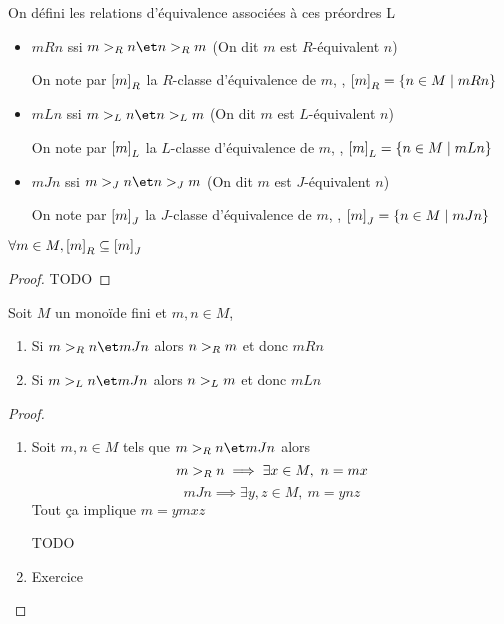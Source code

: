\begin{notation}
	On défini les relations d'équivalence associées à ces préordres L
	\begin{itemize}
		\item $m R n$ ssi $m \geqr n \et n \geqr m$ (On dit $m$ est $R$-équivalent  $n$)

		      On note par $\left[m\right]_R$ la $R$-classe d'équivalence de $m$, \ie, $\left[m\right]_R =
			      \left\{n \in M \mid m R n\right\}$

		\item $m L n$ ssi $m \geql n \et n \geql m$ (On dit $m$ est $L$-équivalent  $n$)

		      On note par $\left[m\right]_L$ la $L$-classe d'équivalence de $m$, \ie, $\left[m\right]_L =
			      \left\{n \in M \mid m L n\right\}$

		\item $m J n$ ssi $m \geqj n \et n \geqj m$ (On dit $m$ est $J$-équivalent  $n$)

		      On note par $\left[m\right]_J$ la $J$-classe d'équivalence de $m$, \ie, $\left[m\right]_J =
			      \left\{n \in M \mid m J n\right\}$
	\end{itemize}
\end{notation}

\begin{exercice}
	$\forall m \in M, \left[m\right]_R \subseteq \left[m\right]_J$
\end{exercice}

\begin{proof}
	TODO
\end{proof}

\begin{lemma}
	Soit $M$ un monoïde fini et $m,n \in M$,

	\begin{enumerate}
		\item Si $m \geqr n \et m J n$ alors $n >_R m$ et donc $m R n$
		\item Si $m \geql n \et m J n$ alors $n >_L m$ et donc $m L n$
	\end{enumerate}
\end{lemma}

\begin{proof}
	\begin{enumerate}
		\item Soit $m,n \in M$ tels que $m \geqr n \et m J n$ alors
		      $$m >_R n  \implies \exists x \in M, \ n = mx$$
		      $$m J n  \implies \exists y,z \in M, \ m = ynz$$
		      Tout ça implique $m = ymxz$

		      TODO

		\item Exercice
	\end{enumerate}
\end{proof}


